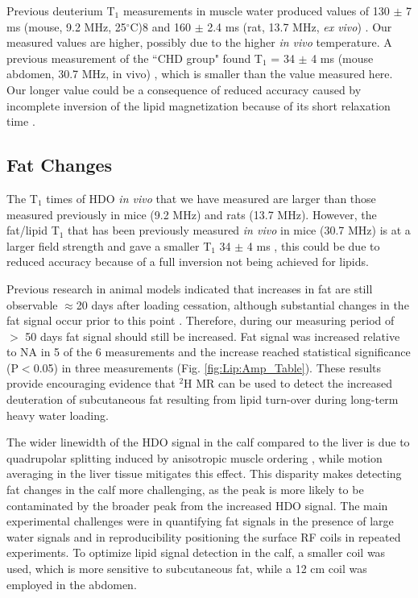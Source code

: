 Previous deuterium T$_1$ measurements in muscle water produced values of 130 $\pm$ 7 ms (mouse, 9.2 MHz, 25$^\circ$C)8 and 160 $\pm$ 2.4 ms (rat, 13.7 MHz, \textit{ex vivo}) \cite{Block1987COMMUNICATIONSTissues}. Our measured values are higher, possibly due to the higher \textit{in vivo} temperature. A previous measurement of the ``CHD group" found T$_1$ = 34 $\pm$ 4 ms (mouse abdomen, 30.7 MHz, in vivo) \cite{Brereton1986PreliminarySpectroscopy}, which is smaller than the value measured here. Our longer value could be a consequence of reduced accuracy caused by incomplete inversion of the lipid magnetization because of its short relaxation time \cite{Pfaff2017PredictingPulses}.


\subsection{Fat Changes}

The T$_1$ times of \ac{HDO} \textit{in vivo} that we have measured are larger than those measured previously in mice \cite{Fung1979StudyWater} (9.2 MHz) and rats \cite{Block1987COMMUNICATIONSTissues} (13.7 MHz). However, the fat/lipid T$_1$ that has been previously measured \textit{in vivo} in mice (30.7 MHz) is at a larger field strength and gave a smaller T$_1$ 34 $\pm$ 4 ms \cite{Brereton1986PreliminarySpectroscopy}, this could be due to reduced accuracy because of a full inversion not being achieved for lipids. 

Previous research in animal models indicated that increases in fat are still observable $\approx$20 days after loading cessation, although substantial changes in the fat signal occur prior to this point \cite{Brereton1986PreliminarySpectroscopy}. Therefore, during our measuring period of $>$ 50 days fat signal should still be increased. Fat signal was increased relative to \ac{NA} in 5 of the 6 measurements and the increase reached statistical significance (P$<$0.05) in three measurements (Fig. \ref{fig:Lip:Amp_Table}). These results provide encouraging evidence that $^2$H MR can be used to detect the increased deuteration of subcutaneous fat resulting from lipid turn-over during long-term heavy water loading. 

The wider linewidth of the \ac{HDO} signal in the calf compared to the liver is due to quadrupolar splitting induced by anisotropic muscle ordering \cite{Gursan2022ResidualMuscle}, while motion averaging in the liver tissue mitigates this effect. This disparity makes detecting fat changes in the calf more challenging, as the peak is more likely to be contaminated by the broader peak from the increased \ac{HDO} signal. The main experimental challenges were in quantifying fat signals in the presence of large water signals and in reproducibility positioning the surface RF coils in repeated experiments. To optimize lipid signal detection in the calf, a smaller coil was used, which is more sensitive to subcutaneous fat, while a 12 cm coil was employed in the abdomen. 


